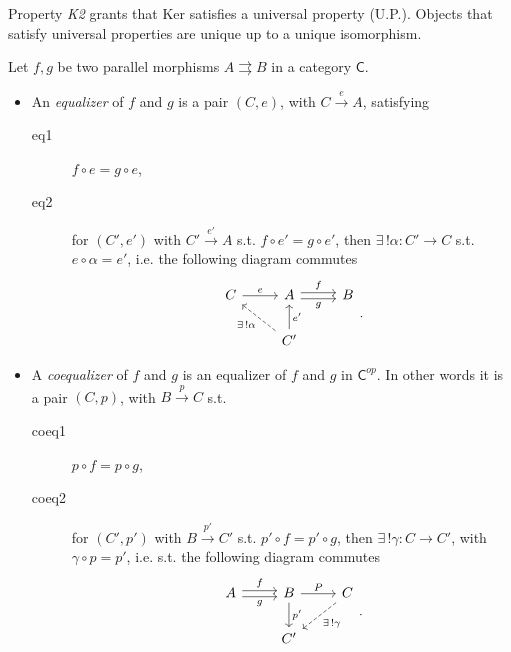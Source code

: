 \begin{rem}
	Property {\em K2} grants that Ker satisfies a universal property (U.P.).
	Objects that satisfy universal properties are unique up to a unique isomorphism. 
\end{rem}

\begin{defn}[(Co)equalizer]
	Let $f,g$ be two parallel morphisms $A \rightrightarrows B$ in a category $\mathsf{C}$.
	\begin{itemize}
		\item An {\em equalizer} of $f$ and $g$ is a pair $\left(C, e\right)$, with $C \xrightarrow{e} A$, satisfying
	\begin{description}
		\item[eq1] $f \circ e = g \circ e$,
		\item[eq2] for $\left(C', e'\right)$ with $C' \xrightarrow{e'} A$ s.t. $f \circ e' = g \circ e'$, then
			$\exists\, ! \alpha\colon C' \to C$ s.t. $e \circ \alpha = e'$, i.e. the following diagram commutes
			\begin{equation}
			\begin{tikzcd}
				C \arrow[r, "e", rightarrow] & A \arrow[r, "f", rightarrow, shift left=.5ex] \arrow[r, "g"', rightarrow, shift right=.5ex] & B\\
				    & C' \arrow[lu, "\exists\, ! \alpha", dashrightarrow] \arrow[u, "e'"', rightarrow] & 
			\end{tikzcd}
			.\end{equation} 
	\end{description}
	\item A {\em coequalizer} of $f$ and $g$ is an equalizer of $f$ and $g$ in $\mathsf{C}^{op}$.
		In other words it is a pair $\left(C, p\right)$, with $B \xrightarrow{p} C$ s.t.
		\begin{description}
			\item[coeq1] $p \circ f = p \circ g$,
			\item[coeq2] for $\left(C', p'\right)$ with $B \xrightarrow{p'} C'$ s.t. $p' \circ f = p' \circ g$, then $\exists\, ! \gamma\colon C \to C'$, with $\gamma \circ p = p'$, i.e. s.t. the following diagram commutes
			\begin{equation}
			\begin{tikzcd}
				A \arrow[r, "f", rightarrow, shift left=.5ex] \arrow[r, "g"', rightarrow, shift right=.5ex] & B \arrow[r, "P", rightarrow] \arrow[d, "p'", rightarrow] & C \arrow[dl, "\exists\, ! \gamma", dashrightarrow] \\
				    & C' & 
			\end{tikzcd}
			.\end{equation} 
		\end{description} 
	\end{itemize}
\end{defn}

